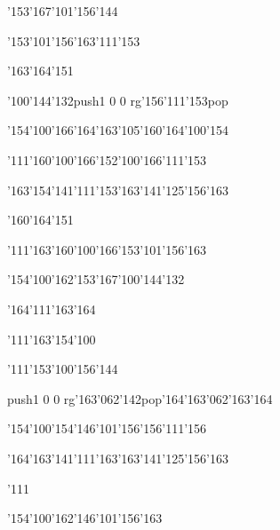 \null\vfill\ipa\centerline{\enskip\enskip\enskip\enskip\enskip\enskip\enskip\enskip\char'153\char'167\char'101\char'156\char'144}\medskip\centerline{\enskip\enskip\enskip\enskip\enskip\enskip\enskip\char'153\char'101\char'156\char'163\enskip\char'111\char'153}\medskip\centerline{\enskip\enskip\enskip\char'163\char'164\char'151\enskip\enskip\enskip\enskip\enskip\enskip}\medskip\centerline{\enskip\enskip\enskip\enskip\char'100\char'144\char'132\enskip\enskip\enskip\enskip\pdfcolorstack\match push{1 0 0 rg}\char'156\char'111\char'153\pdfcolorstack\match pop{}}\medskip\centerline{\enskip\char'154\char'100\char'166\enskip\enskip\enskip\enskip\enskip\enskip\enskip\char'164\char'163\char'105\char'160\char'164\enskip\char'100\char'154}\medskip\centerline{\enskip\char'111\enskip\enskip\enskip\enskip\enskip\char'160\char'100\char'166\enskip\char'152\char'100\char'166\enskip\char'111\char'153}\medskip\centerline{\enskip\char'163\char'154\char'141\char'111\char'153\enskip\enskip\enskip\enskip\char'163\char'141\char'125\char'156\char'163\enskip\enskip\enskip}\medskip\centerline{\enskip\enskip\enskip\char'160\char'164\char'151\enskip\enskip\enskip\enskip\enskip\enskip}\medskip\centerline{\enskip\char'111\char'163\enskip\enskip\enskip\enskip\char'160\char'100\char'166\enskip\char'153\char'101\char'156\char'163}\medskip\vfill\footline{\hfil\tt\folio\hfil}\eject
\null\vfill\ipa\centerline{\enskip\enskip\enskip\enskip\char'154\char'100\char'162\enskip\char'153\char'167\char'100\char'144\char'132}\medskip\centerline{\enskip\enskip\enskip\enskip\enskip\enskip\enskip\char'164\char'111\char'163\char'164\enskip\enskip\enskip}\medskip\centerline{\enskip\char'111\enskip\char'163\char'154\char'100\enskip\enskip\enskip\enskip\enskip\enskip}\medskip\centerline{\enskip\char'111\char'153\enskip\char'100\char'156\char'144\enskip\enskip\enskip\enskip\enskip\enskip\enskip}\medskip\centerline{\enskip\pdfcolorstack\match push{1 0 0 rg}\char'163\char'062\char'142\pdfcolorstack\match pop{}\enskip\enskip\enskip\enskip\enskip\enskip\enskip\char'164\char'163\char'062\char'163\char'164\enskip\enskip\enskip}\medskip\centerline{\enskip\enskip\enskip\char'154\char'100\char'154\enskip\char'146\char'101\char'156\enskip\char'156\char'111\char'156\enskip\enskip\enskip}\medskip\centerline{\enskip\char'164\char'163\char'141\char'111\char'163\enskip\enskip\enskip\enskip\char'163\char'141\char'125\char'156\char'163\enskip\enskip\enskip}\medskip\centerline{\enskip\char'111\enskip\enskip\enskip\enskip\enskip\enskip\enskip\enskip\enskip\enskip}\medskip\centerline{\enskip\enskip\enskip\enskip\enskip\enskip\enskip\char'154\char'100\char'162\enskip\char'146\char'101\char'156\char'163}\medskip\vfill\footline{\hfil\tt\folio\hfil}\eject
